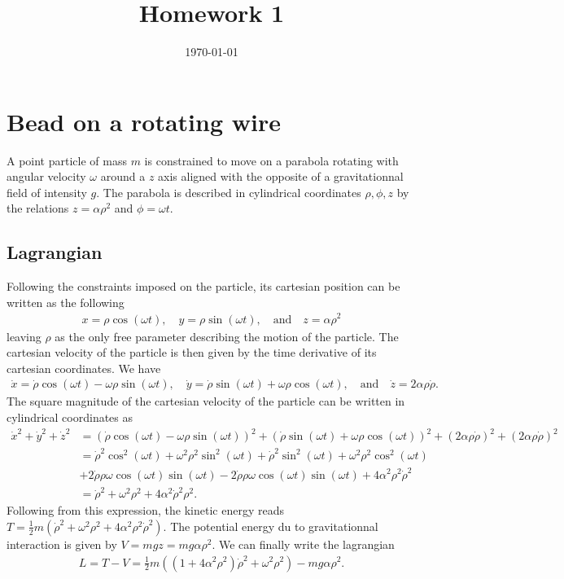 \documentclass[12pt, a4paper]{article}
\title{Homework 1} %
\author{\PA} %
\date{\today} %
\begin{document}
\maketitlepage

\maketableofcontents

\section{Bead on a rotating wire}
A point particle of mass $m$ is constrained to move on a parabola rotating with angular velocity $\omega$ around a $z$ axis aligned with the opposite of a gravitationnal field of intensity $g$. The parabola is described in cylindrical coordinates $\rho, \phi, z$ by the relations $z = \alpha \rho^2$ and $\phi = \omega t$. %
\subsection{Lagrangian}
Following the constraints imposed on the particle, its cartesian position can be written as the following
\begin{align*}
    x = \rho \cos(\omega t), \quad y = \rho \sin(\omega t), \quad \text{and} \quad z = \alpha\rho^2 
\end{align*}
leaving $\rho$ as the only free parameter describing the motion of the particle. The cartesian velocity of the particle is then given by the time derivative of its cartesian coordinates. We have 
\begin{align*}
    \dot{x} = \dot{\rho} \cos(\omega t) - \omega \rho \sin(\omega t), \quad \dot{y} = \dot{\rho} \sin(\omega t) + \omega \rho \cos(\omega t) , \quad \text{and} \quad \dot{z} = 2\alpha\rho \dot{\rho}.
\end{align*}
The square magnitude of the cartesian velocity of the particle can be written in cylindrical coordinates as 
\begin{align*}
    \dot{x}^2 + \dot{y}^2 + \dot{z}^2 &= \left(\dot{\rho} \cos(\omega t) - \omega \rho \sin(\omega t)\right)^2 + \left(\dot{\rho} \sin(\omega t) + \omega \rho \cos(\omega t)\right)^2 + \left(2\alpha\rho \dot{\rho}\right)^2 + (2\alpha\rho \dot{\rho})^2 \\ &=  \dot{\rho}^2 \cos^2(\omega t) + \omega^2 \rho^2 \sin^2(\omega t) + \dot{\rho}^2 \sin^2(\omega t) + \omega^2 \rho^2 \cos^2(\omega t) \\&+ 2\dot{\rho} \rho \omega \cos(\omega t) \sin(\omega t) - 2 \dot{\rho} \rho \omega \cos(\omega t) \sin(\omega t) + 4\alpha^2\rho^2 \dot{\rho}^2\\
    &= \dot{\rho}^2  +\omega^2 \rho^2 + 4\alpha^2 \dot{\rho}^2 \rho^2. 
\end{align*}
Following from this expression, the kinetic energy reads $T = \frac{1}{2}m \left(\dot{\rho}^2  + \omega^2 \rho^2 + 4\alpha^2 \rho^2 \dot{\rho}^2 \right)$.
The potential energy du to gravitationnal interaction is given by $V = mgz = mg \alpha \rho^2$. We can finally write the lagrangian 
\begin{align*}
    L = T - V =  \frac{1}{2}m \left(\left(1 + 4\alpha^2 \rho^2\right) \dot{\rho}^2  + \omega^2\rho^2 \right) - mg \alpha \rho^2.
\end{align*}
\end{document}
